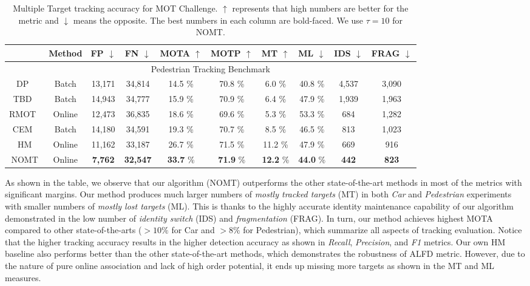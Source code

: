 \documentclass[10pt,twocolumn,letterpaper]{article}
\begin{document}
\begin{table*}
\begin{center}
{\scriptsize
\begin{tabular}{| c || c || c | c || c | c | c | c | c | c |}
\hline
& Method & FP $\downarrow$ & FN $\downarrow$ & MOTA $\uparrow$ & MOTP $\uparrow$ & MT $\uparrow$ & ML $\downarrow$ & IDS $\downarrow$ & FRAG $\downarrow$ \\ 
\hline
\hline
\multicolumn{10}{|c|}{Pedestrian Tracking Benchmark} \\
\hline
DP~\cite{Pirsiavash_CVPR_11} & Batch & 13,171 & 34,814 & 14.5 \% & 70.8 \% & 6.0 \% & 40.8 \% & 4,537 & 3,090 \\
TBD~\cite{Geiger2014PAMI} & Batch & 14,943 & 34,777 & 15.9 \% & 70.9 \% & 6.4 \%	& 47.9 \% & 1,939 &	1,963 \\	
RMOT~\cite{YoonWACV2015} & Online & 12,473 & 36,835 & 18.6 \% & 69.6 \% & 5.3 \% & 53.3 \% & 684 & 1,282\\
CEM~\cite{Milan:2014:CEM} & Batch & 14,180 & 34,591 & 19.3 \% & 70.7 \% & 8.5 \% & 46.5 \% & 813 & 1,023 \\
\hline
HM & Online & 11,162 & 33,187 & 26.7 \% & 71.5 \% &  11.2 \% & 47.9 \% & 669 & 916 \\
NOMT & Online & {\bf 7,762} & {\bf 32,547} & {\bf 33.7} \% & {\bf 71.9} \% & {\bf 12.2} \% & {\bf 44.0} \% & {\bf 442} & {\bf 823} \\
\hline
\end{tabular}
}
\caption{Multiple Target tracking accuracy for MOT Challenge. $\uparrow$ represents that high numbers are better for the metric and $\downarrow$ means the opposite. The best numbers in each column are bold-faced. We use $\tau = 10$ for NOMT.}
\label{tab:mot}
\end{center} \end{table*}

As shown in the table, we observe that our algorithm (NOMT) outperforms the other state-of-the-art methods in most of the metrics with significant margins. Our method produces much larger numbers of \emph{mostly tracked targets} (MT) in both \emph{Car} and \emph{Pedestrian} experiments with smaller numbers of \emph{mostly lost targets} (ML). This is thanks to the highly accurate identity maintenance capability of our algorithm demonstrated in the low number of \emph{identity switch} (IDS) and \emph{fragmentation} (FRAG). In turn, our method achieves highest MOTA compared to other state-of-the-arts ($> 10 \%$ for Car and $> 8 \%$ for Pedestrian), which summarize all aspects of tracking evaluation. Notice that the higher tracking accuracy results in the higher detection accuracy as shown in \emph{Recall}, \emph{Precision}, and \emph{F1} metrics. Our own HM baseline also performs better than the other state-of-the-art methods, which demonstrates the robustness of ALFD metric. However, due to the nature of pure online association and lack of high order potential, it ends up missing more targets as shown in the MT and ML measures.  
\end{document}
